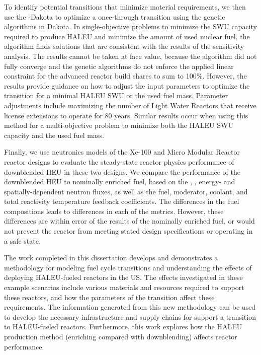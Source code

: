To identify potential transitions that minimize material requirements,
we then use the \Cyclus-Dakota to optimize a once-through transition
using the genetic algorithms in Dakota. In single-objective problems to 
minimize the \gls{SWU} capacity required to produce \gls{HALEU} and 
minimize the amount of used nuclear fuel, the algorithm finds 
solutions that are consistent with the results of the 
sensitivity analysis. The results cannot be taken at face 
value, because the algorithm did not fully converge and the genetic 
algorithms do not enforce the applied
linear constraint for the advanced reactor build shares to sum to 
100\%. However, the results provide guidance on how to 
adjust the 
input parameters to optimize the transition for a minimal \gls{HALEU} 
\gls{SWU} or the used fuel mass. Parameter adjustments include 
maximizing the 
number of Light Water Reactors that receive license extensions to 
operate for 80 years. Similar results occur when using 
this method for a multi-objective problem to minimize both the 
\gls{HALEU} \gls{SWU} capacity and the used fuel mass. 

Finally, we use neutronics models of the Xe-100 and Micro Modular Reactor 
reactor designs to 
evaluate the steady-state reactor physics performance of downblended 
\gls{HEU} in these 
two designs. We compare the performance of the downblended 
\gls{HEU} to nominally enriched fuel, based on the 
\keff, \betaEff, energy- and spatially-dependent neutron 
fluxes, as well as the fuel, moderator, coolant, and total reactivity 
temperature feedback coefficients. The differences in the fuel 
compositions leads to differences in each of the metrics. 
However, these differences are within error of the 
results of the nominally enriched fuel, or would not prevent the 
reactor from meeting stated design specifications or operating 
in a safe state. 

The work completed in this dissertation develops and demonstrates a 
methodology for modeling fuel cycle transitions and  
understanding the effects of deploying \gls{HALEU}-fueled reactors 
in the US. The effects investigated in these example scenarios 
include various materials and 
resources required to support these reactors, and how the 
parameters of the transition affect these requirements. The 
information generated from this new methodology can be used 
to develop the necessary infrastructure 
and supply chains for support a transition to \gls{HALEU}-fueled 
reactors. Furthermore, this work explores how the 
\gls{HALEU} production method (enriching compared with downblending)
affects reactor performance. 
